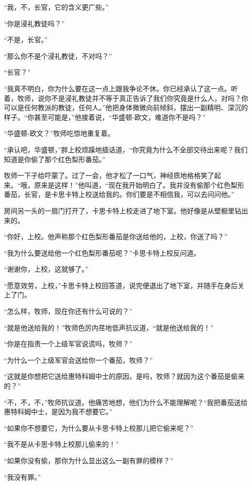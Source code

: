     “我，不，长官，它的含义更广些。”

    “你是浸礼教徒吗？”

    “不是，长官。”

    “那么你不是个浸礼教徒，不对吗？”

    “长官？”

    “我真不明白，你为什么要在这一点上跟我争论不休。你已经承认了这一点。听着，牧师，说你不是浸礼教徒并不等于真正告诉了我们你究竟是什么人，对吗？你可以是任何教派的教徒，任何人。”他把身体微微向前倾斜，摆出一副精明、深沉的样子。“你甚至可能是，”他接着说，“华盛顿-欧文，难道你不是吗？”

    “华盛顿-欧文？”牧师吃惊地重复着。

    “承认吧，华盛顿，”胖上校烦躁地插话道，“你究竟为什么不全部交待出来呢？我们知道是你偷了那个红色梨形番茄。”

    牧师一下子给吓蒙了。过了一会，他才松了一口气，神经质地格格笑了起来。“哦，原来是这样！”他叫道，“现在我开始明白了。我并没有偷那个红色梨形番茄，长官，是卡思卡特上校送给我的。你们要是不相信我，可以去问问他。”

    房间另一头的一扇门打开了，卡思卡特上校走进了地下室。他好像是从壁橱里钻出来的。

    “你好，上校。他声称那个红色梨形番茄是你送给他的，上校，你送了吗？”

    “我为什么要送给他一个红色梨形番茄呢？”卡思卡特上校反问道。

    “谢谢你，上校，这就够了。”

    “愿意效劳，上校，”卡思卡特上校回答道，说完便退出了地下室，并随手在身后关上了门。

    “怎么样，牧师，现在你还有什么可说的？”

    “就是他送给我的！”牧师色厉内荏地低声抗议道，“就是他送给我的！”

    “你是在指责一个上级军官说谎吗，牧师？”

    “为什么一个上级军官会送给你一个番茄，牧师？”

    “这就是你想把它送给惠特科姆中士的原因，是吗，牧师？就因为这个番茄是偷来的？”

    “不，不，不，”牧师抗议道。他痛苦地想，他们为什么不能理解呢？“我把番茄送给惠特科姆中士，是因为我不想要它。”

    “如果你不想要它，为什么要从卡思卡特上校那儿把它偷来呢？”

    “我不是从卡思卡特上校那儿偷来的！”

    “如果你没有偷，那你为什么显出这么一副有罪的模样？”

    “我没有罪。”

